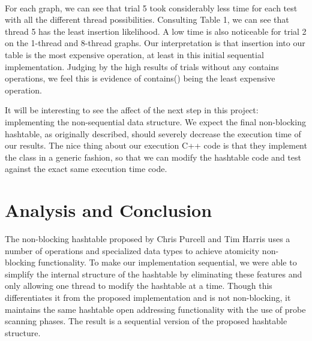 \documentclass[journal]{IEEEtran}
\begin{document}
\hfill\\

For each graph, we can see that trial 5 took considerably less time for each test with all the different thread possibilities. Consulting Table 1, we can see that thread 5 has the least insertion likelihood. A low time is also noticeable for trial 2 on the 1-thread and 8-thread graphs. Our interpretation is that insertion into our table is the most expensive operation, at least in this initial sequential implementation. Judging by the high results of trials without any contains operations, we feel this is evidence of contains() being the least expensive operation.

It will be interesting to see the affect of the next step in this project: implementing the non-sequential data structure. We expect the final non-blocking hashtable, as originally described, should severely decrease the execution time of our results. The nice thing about our execution C++ code is that they implement the class in a generic fashion, so that we can modify the hashtable code and test against the exact same execution time code.



\section{Analysis and Conclusion}

The non-blocking hashtable proposed by Chris Purcell and Tim Harris uses a number of operations and specialized data types to achieve atomicity non-blocking functionality.  To make our implementation sequential, we were able to simplify the internal structure of the hashtable by eliminating these features and only allowing one thread to modify the hashtable at a time. Though this differentiates it from the proposed implementation and is not non-blocking, it maintains the same hashtable open addressing functionality with the use of probe scanning phases. The result is a sequential version of the proposed hashtable structure.


\end{document}
